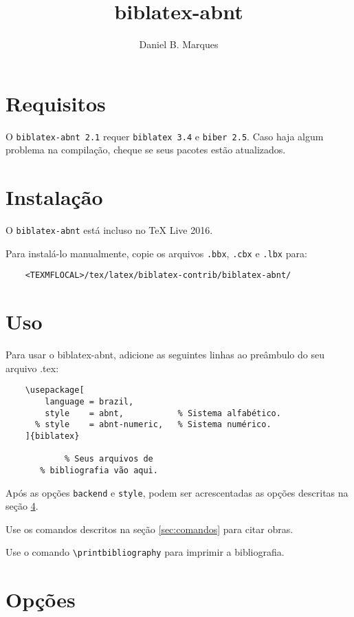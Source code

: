 \documentclass[a4paper]{article}
\title{biblatex-abnt \version}
\author{Daniel B. Marques}
\newcommand{\version}{2.1}
\newcommand{\requirements}{\texttt{biblatex 3.4} e \texttt{biber 2.5}}
\begin{document}
\maketitle

\tableofcontents

\clearpage
\section{Requisitos}

O \texttt{biblatex-abnt \version} requer \requirements. Caso haja algum
problema na compilação, cheque se seus pacotes estão atualizados.

\section{Instalação}

O \texttt{biblatex-abnt} está incluso no TeX Live 2016.

Para instalá-lo manualmente, copie os arquivos \texttt{.bbx}, \texttt{.cbx} e
\texttt{.lbx} para:
\begin{verbatim}
    <TEXMFLOCAL>/tex/latex/biblatex-contrib/biblatex-abnt/
\end{verbatim}

\section{Uso}

Para usar o {biblatex-abnt}, adicione as seguintes linhas ao preâmbulo do seu
arquivo {.tex}:

\begin{verbatim}
    \usepackage[
        language = brazil,
        style    = abnt,           % Sistema alfabético.
      % style    = abnt-numeric,   % Sistema numérico.
    ]{biblatex}

            % Seus arquivos de
       % bibliografia vão aqui.
\end{verbatim}

Após as opções \texttt{backend} e \texttt{style}, podem ser acrescentadas
as opções descritas na seção \ref{sec:opções}.

Use os comandos descritos na seção \ref{sec:comandos} para citar obras.

Use o comando \verb"\printbibliography" para imprimir a bibliografia.

\clearpage
\section{Opções}
\label{sec:opções}
\end{document}
